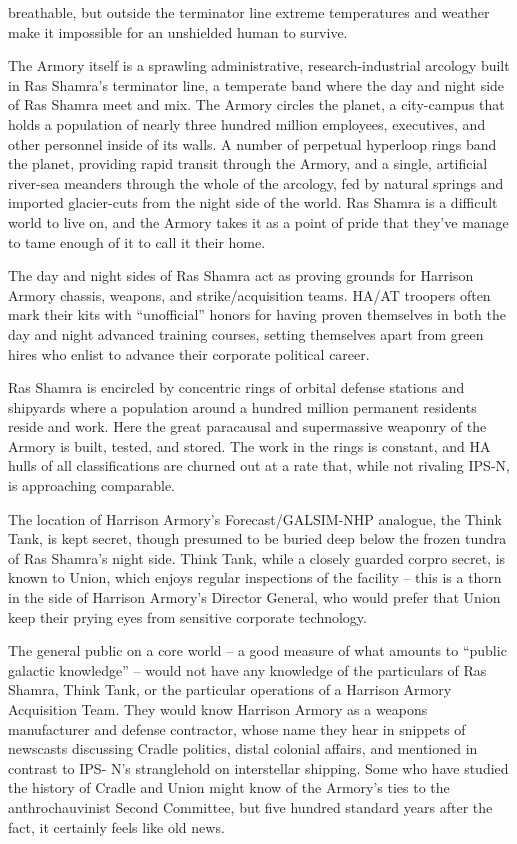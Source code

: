                                                                                                            


breathable, but outside the terminator line extreme temperatures and weather make it impossible  
for an unshielded human to survive. 
 

The Armory itself is a sprawling administrative, research-industrial arcology built in Ras Shamra’s  
terminator line, a temperate band where the day and night side of Ras Shamra meet and mix.  
The Armory circles the planet, a city-campus that holds a population of nearly three hundred  
million employees, executives, and other personnel inside of its walls. A number of perpetual  
hyperloop rings band the planet, providing rapid transit through the Armory, and a single, artificial  
river-sea meanders through the whole of the arcology, fed by natural springs and imported  
glacier-cuts from the night side of the world. Ras Shamra is a difficult world to live on, and the  
Armory takes it as a point of pride that they’ve manage to tame enough of it to call it their home.  
 

The day and night sides of Ras Shamra act as proving grounds for Harrison Armory chassis,  
weapons, and strike/acquisition teams. HA/AT troopers often mark their kits with “unofficial”  
honors for having proven themselves in both the day and night advanced training courses,  
setting themselves apart from green hires who enlist to advance their corporate political career.
 

Ras Shamra is encircled by concentric rings of orbital defense stations and shipyards where a  
population around a hundred million permanent residents reside and work. Here the great  
paracausal and supermassive weaponry of the Armory is built, tested, and stored. The work in  
the rings is constant, and HA hulls of all classifications are churned out at a rate that, while not  
rivaling IPS-N, is approaching comparable. 
 

The location of Harrison Armory’s Forecast/GALSIM-NHP analogue, the Think Tank, is kept  
secret, though presumed to be buried deep below the frozen tundra of Ras Shamra’s night side.  
Think Tank, while a closely guarded corpro secret, is known to Union, which enjoys regular  
inspections of the facility -- this is a thorn in the side of Harrison Armory’s Director General, who  
would prefer that Union keep their prying eyes from sensitive corporate technology. 
 

The general public on a core world -- a good measure of what amounts to “public galactic  
knowledge” -- would not have any knowledge of the particulars of Ras Shamra, Think Tank, or  
the particular operations of a Harrison Armory Acquisition Team. They would know Harrison  
Armory as a weapons manufacturer and defense contractor, whose name they hear in snippets  
of newscasts discussing Cradle politics, distal colonial affairs, and mentioned in contrast to IPS- 
N’s stranglehold on interstellar shipping. Some who have studied the history of Cradle and Union  
might know of the Armory’s ties to the anthrochauvinist Second Committee, but five hundred  
standard years after the fact, it certainly feels like old news. 
 
